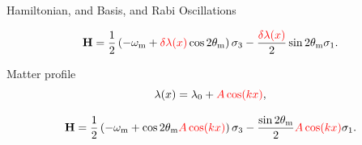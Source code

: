 \begin{frame}{Hamiltonian, and Basis, and Rabi Oscillations}



\begin{tcolorbox}[title=Hamiltonian in Background Matter Basis]
    \begin{equation*}
    \mathbf {H} = \frac{1}{2}\left( - \omega_{\mathrm{m}} + {\color{red}\delta \lambda(x)} \cos 2\theta_{\mathrm{m}} \right) \sigma_3 - \frac{  {\color{red}\delta \lambda(x)}  }{2} \sin 2\theta_{\mathrm{m}} \sigma_1.
\end{equation*}
\end{tcolorbox}


Matter profile
\begin{equation*}
    \lambda(x) = \lambda_0 + {\color{red}A \cos (k x)},
\end{equation*}


\begin{equation*}
    \mathbf {H} = \frac{1}{2}\left( - \omega_{\mathrm{m}} +  \cos 2\theta_{\mathrm{m}}{\color{red}A\cos(kx)} \right) \sigma_3 - \frac{  \sin 2\theta_{\mathrm{m} }  }{2}{\color{red}A \cos(kx)}  \sigma_1.
\end{equation*}





\end{frame}


